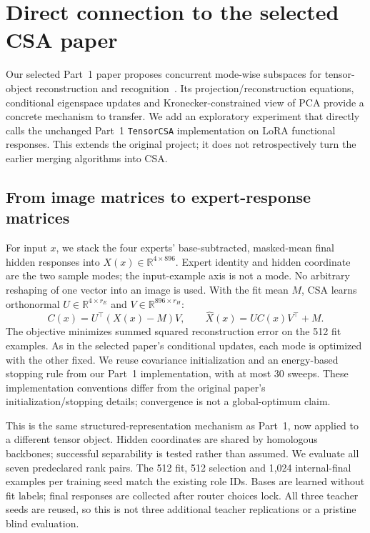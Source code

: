 \section{Direct connection to the selected CSA paper}
\label{sec:csa-bridge}
Our selected Part~1 paper proposes concurrent mode-wise subspaces for tensor-object reconstruction and recognition~\cite{csa}. Its projection/reconstruction equations, conditional eigenspace updates and Kronecker-constrained view of PCA provide a concrete mechanism to transfer. We add an exploratory experiment that directly calls the unchanged Part~1 \texttt{TensorCSA} implementation on LoRA functional responses. This extends the original project; it does not retrospectively turn the earlier merging algorithms into CSA.

\subsection{From image matrices to expert-response matrices}
For input $x$, we stack the four experts' base-subtracted, masked-mean final hidden responses into $X(x)\in\mathbb R^{4\times896}$. Expert identity and hidden coordinate are the two sample modes; the input-example axis is not a mode. No arbitrary reshaping of one vector into an image is used. With the fit mean $M$, CSA learns orthonormal $U\in\mathbb R^{4\times r_E}$ and $V\in\mathbb R^{896\times r_H}$:
\[
 C(x)=U^\top(X(x)-M)V,\qquad
 \widehat X(x)=UC(x)V^\top+M.
\]
The objective minimizes summed squared reconstruction error on the 512 fit examples. As in the selected paper's conditional updates, each mode is optimized with the other fixed. We reuse covariance initialization and an energy-based stopping rule from our Part~1 implementation, with at most 30 sweeps. These implementation conventions differ from the original paper's initialization/stopping details; convergence is not a global-optimum claim.

This is the same structured-representation mechanism as Part~1, now applied to a different tensor object. Hidden coordinates are shared by homologous backbones; successful separability is tested rather than assumed. We evaluate all seven predeclared rank pairs. The 512 fit, 512 selection and 1,024 internal-final examples per training seed match the existing role IDs. Bases are learned without fit labels; final responses are collected after router choices lock. All three teacher seeds are reused, so this is not three additional teacher replications or a pristine blind evaluation.

